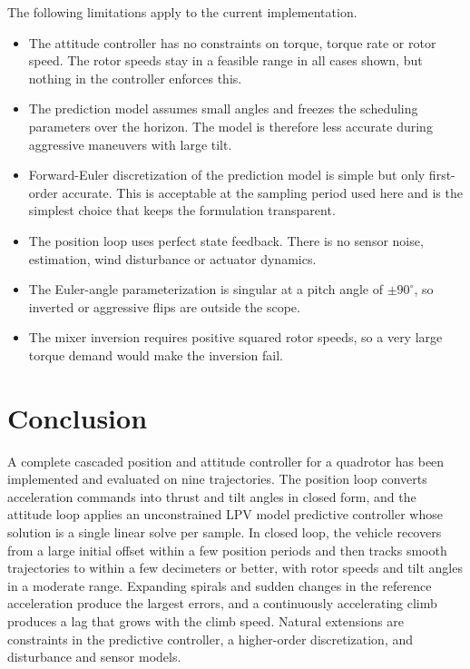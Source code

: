 \documentclass[11pt,a4paper]{article}
\numberwithin{equation}{section}
\begin{document}
The following limitations apply to the current implementation.

\begin{itemize}
\item The attitude controller has no constraints on torque, torque rate or rotor speed. The rotor speeds stay in a feasible range in all cases shown, but nothing in the controller enforces this.
\item The prediction model assumes small angles and freezes the scheduling parameters over the horizon. The model is therefore less accurate during aggressive maneuvers with large tilt.
\item Forward-Euler discretization of the prediction model is simple but only first-order accurate. This is acceptable at the sampling period used here and is the simplest choice that keeps the formulation transparent.
\item The position loop uses perfect state feedback. There is no sensor noise, estimation, wind disturbance or actuator dynamics.
\item The Euler-angle parameterization is singular at a pitch angle of $\pm 90^\circ$, so inverted or aggressive flips are outside the scope.
\item The mixer inversion requires positive squared rotor speeds, so a very large torque demand would make the inversion fail.
\end{itemize}

\section{Conclusion}\label{sec:conclusion}

A complete cascaded position and attitude controller for a quadrotor has been implemented and evaluated on nine trajectories. The position loop converts acceleration commands into thrust and tilt angles in closed form, and the attitude loop applies an unconstrained LPV model predictive controller whose solution is a single linear solve per sample. In closed loop, the vehicle recovers from a large initial offset within a few position periods and then tracks smooth trajectories to within a few decimeters or better, with rotor speeds and tilt angles in a moderate range. Expanding spirals and sudden changes in the reference acceleration produce the largest errors, and a continuously accelerating climb produces a lag that grows with the climb speed. Natural extensions are constraints in the predictive controller, a higher-order discretization, and disturbance and sensor models.
\end{document}
